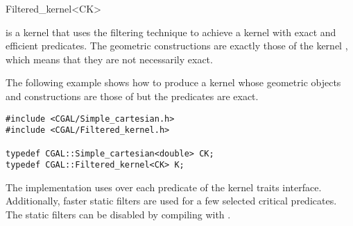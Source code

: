 
\begin{ccRefClass}{Filtered_kernel<CK>}


\KernelRefLayout\gdef\ccTagOperatorLayout{\ccFalse}

\ccDefinition

\ccClassTemplateName is a kernel that uses the filtering technique
\cite{cgal:bbp-iayed-01} to achieve a kernel with exact and efficient
predicates.
The geometric constructions are exactly those
of the kernel , which means that they are not necessarily exact.







\ccExample

The following example shows how to produce a kernel whose geometric
objects and constructions are those of 
but the predicates are exact. 

\begin{verbatim}
#include <CGAL/Simple_cartesian.h>
#include <CGAL/Filtered_kernel.h>

typedef CGAL::Simple_cartesian<double> CK;
typedef CGAL::Filtered_kernel<CK> K;

\end{verbatim}

\ccImplementation
The implementation uses  over
each predicate of the kernel traits interface.  Additionally, faster static
filters are used for a few selected critical predicates.  The static filters
can be disabled by compiling with .

\end{ccRefClass}
